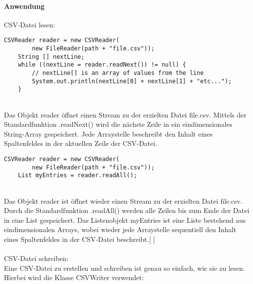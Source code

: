 \documentclass[FIPLY_base.tex]{subfiles}
\begin{document}
\paragraph{Anwendung}
CSV-Datei lesen:
\begin{lstlisting}[caption={Verwendung von CSVReader: Möglichkeit 1, iterativ},label=DescriptiveLabel]
	CSVReader reader = new CSVReader(
		new FileReader(path + "file.csv"));
	String [] nextLine;
	while ((nextLine = reader.readNext()) != null) {
		// nextLine[] is an array of values from the line
		System.out.println(nextLine[0] + nextLine[1] + "etc...");
	}

\end{lstlisting}
\ \\
Das Objekt \grqq{}reader\grqq{} öffnet einen Stream zu der erzielten Datei \grqq{}file.csv\grqq{}. Mittels der Standardfunktion .readNext() wird die nächste Zeile in ein eindimensionales String-Array gespeichert. Jede Arraystelle beschreibt den Inhalt eines Spaltenfeldes in der aktuellen Zeile der CSV-Datei.
\ \\
\begin{lstlisting}[caption={Verwendung von CSVReader: Möglichkeit 2, alles auf einmal},label=DescriptiveLabel]
	CSVReader reader = new CSVReader(
		new FileReader(path + "file.csv"));
	List myEntries = reader.readAll();
\end{lstlisting}
\ \\
Das Objekt \grqq{}reader\grqq{} ist öffnet wieder einen Stream zu der erzielten Datei \grqq{}file.csv\grqq{}. Durch die Standardfunktion .readAll() werden alle Zeilen bis zum Ende der Datei in eine List gespeichert. Das Listenobjekt myEntries ist eine Liste bestehend aus eindimensionalen Arrays, wobei wieder jede Arraystelle sequentiell den Inhalt eines Spaltenfeldes in der CSV-Datei beschreibt.[ \cite{exportCSVSourceRead}] 
\ \\
\ \\
CSV-Datei schreiben:
\ \\
Eine CSV-Datei zu erstellen und schreiben ist genau so einfach, wie sie zu lesen. Hierbei wird die Klasse \grqq{}CSVWriter\grqq{} verwendet:
\end{document}
